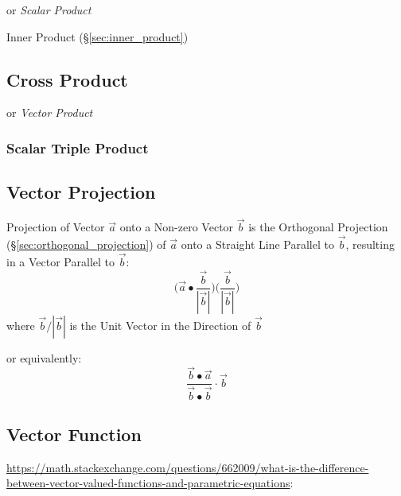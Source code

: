 or \emph{Scalar Product}

Inner Product (\S\ref{sec:inner_product})



\subsection{Cross Product}\label{sec:cross_product}

or \emph{Vector Product}



\subsubsection{Scalar Triple Product}\label{sec:scalar_triple_product}



\subsection{Vector Projection}\label{sec:vector_projection}

Projection of Vector $\vec{a}$ onto a Non-zero Vector $\vec{b}$ is the
Orthogonal Projection (\S\ref{sec:orthogonal_projection}) of $\vec{a}$ onto a
Straight Line Parallel to $\vec{b}$, resulting in a Vector Parallel to
$\vec{b}$:
\[
  \big(\vec{a} \bullet \frac{\vec{b}}{|\vec{b}|}\big)
  \big(\frac{\vec{b}}{|\vec{b}|}\big)
\]
where $\vec{b}/|\vec{b}|$ is the Unit Vector in the Direction of $\vec{b}$

or equivalently:
\[
\frac{\vec{b} \bullet \vec{a}}
  {\vec{b} \bullet \vec{b}} \cdot \vec{b}
\]



\subsection{Vector Function}\label{sec:vector_function}

\url{https://math.stackexchange.com/questions/662009/what-is-the-difference-between-vector-valued-functions-and-parametric-equations}:

